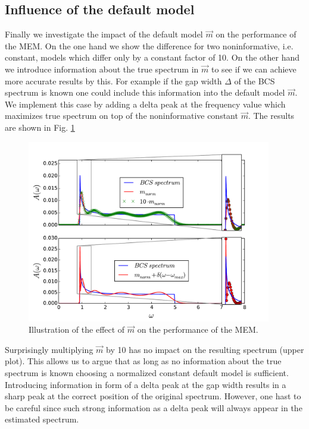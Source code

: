 \subsection*{Influence of the default model}
Finally we investigate the impact of the default model $\vec m$ on the performance of the MEM. On the one hand we show the difference for two noninformative, i.e. constant, models which differ only by a constant factor of 10. On the other hand we introduce information about the true spectrum in $\vec m$ to see if we can achieve more accurate results by this. For example if the gap width $\Delta$ of the BCS spectrum is known one could include this information into the default model $\vec m$. We implement this case by adding a delta peak at the frequency value which maximizes true spectrum on top of the noninformative constant $\vec m$. The results are shown in Fig. \ref{results:fig_6}
\begin{figure}[htbp]
	\centering
	\includegraphics[width=0.95\textwidth]{./images/BCS_delta_peak_example.pdf}
	\caption{Illustration of the effect of $\vec m$ on the performance of the MEM.}
	\label{results:fig_6}
\end{figure}
\FloatBarrier
Surprisingly multiplying $\vec m$ by 10 has no impact on the resulting spectrum (upper plot). This allows us to argue that as long as no information about the true spectrum is known choosing a normalized constant default model is sufficient.
Introducing information in form of a delta peak at the gap width results in a sharp peak at the correct position of the original spectrum. However, one hast to be careful since such strong information as a delta peak will always appear in the estimated spectrum.

